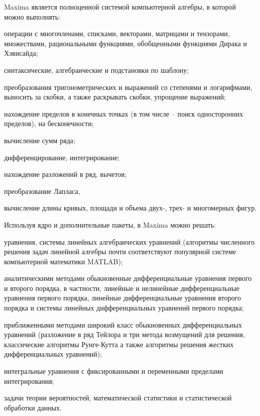 Maxima является полноценной системой компьютерной алгебры, в которой можно выполнять:
\begin{textitemize}
	\item операции с многочленами, списками, векторами, матрицами и тензорами, множествами, рациональными функциями, обобщенными функциями Дирака и Хэвисайда;
	\item синтаксические, алгебраические и подстановки по шаблону;
	\item преобразования тригонометрических и выражений со степенями и логарифмами, выносить за скобки, а также раскрывать скобки, упрощение выражений;
	\item нахождение пределов в конечных точках (в том числе – поиск односторонних пределов), на бесконечности;
	\item вычисление сумм ряда;
	\item дифференцирование, интегрирование;
	\item нахождение разложений в ряд, вычетов;
	\item преобразование Лапласа, 
	\item вычисление длины кривых, площади и объема двух-, трех- и многомерных фигур.
\end{textitemize}
Используя ядро и дополнительные пакеты, в Maxima можно решать:
\begin{textitemize}
	\item уравнения, системы линейных алгебраических уравнений (алгоритмы численного решения задач линейной алгебры почти соответствуют популярной системе компьютерной математики MATLAB);
	\item аналитическими методами обыкновенные дифференциальные уравнения первого и второго порядка, в частности, линейные и нелинейные дифференциальные уравнения первого порядка, линейные дифференциальные уравнения второго порядка и системы линейных дифференциальных уравнений первого порядка;
	\item приближенными методами широкий класс обыкновенных дифференциальных уравнений (разложение в ряд Тейлора и три метода возмущений для решения, классические алгоритмы Рунге-Кутта а также алгоритмы решения жестких дифференциальных уравнений);
	\item интегральные уравнения с фиксированными и переменными пределами интегрирования;
	\item задачи теории вероятностей, математической статистики и статистической обработки данных.
\end{textitemize}

